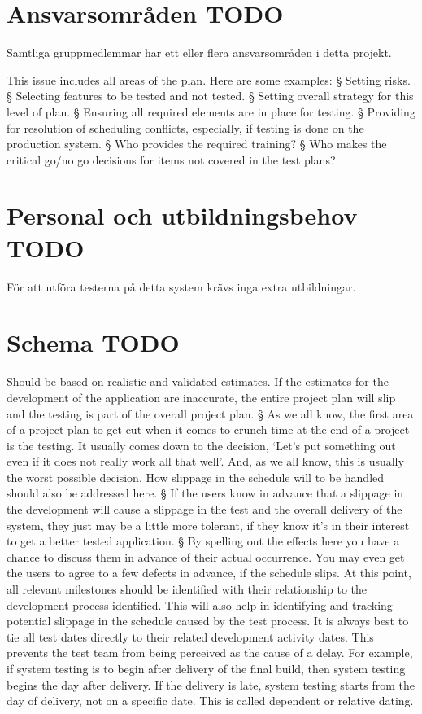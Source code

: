 \documentclass[10pt]{article}
\begin{document}
\section{Ansvarsområden {\color{red}TODO}}
	Samtliga gruppmedlemmar har ett eller flera ansvarsområden i detta projekt. 

This issue includes all areas of the plan.  Here are some examples: 
§ 
Setting risks. 
§ 
Selecting features to be tested and not tested. 
§ 
Setting overall strategy for this level of plan. 
§ 
Ensuring all required elements are in place for testing. 
§ 
Providing for resolution of scheduling conflicts, especially, if testing is done on the 
production system. 
§ 
Who provides the required training? 
§ 
Who makes the critical go/no go decisions for items not covered in the test plans?




\section{Personal och utbildningsbehov {\color{red}TODO}}
	För att utföra testerna på detta system krävs inga extra utbildningar.

\section{Schema {\color{red}TODO}}

Should be based on realistic and validated estimates.  If the estimates for the development of 
the application are inaccurate, the entire project plan will slip and the testing is part of the 
overall project plan. 
§ 
As we all know, the first area of a project plan to get cut when it comes to crunch time at 
the end of a project is the testing.  It usually comes down to the decision, ‘Let’s put 
something out even if it does not really work all that well’. And, as we all know, this is 
usually the worst possible decision. 
How slippage in the schedule will to be handled should also be addressed here. 
§ 
If the users know in advance that a slippage in the development will cause a slippage in 
the test and the overall delivery of the system, they just may be a little more tolerant, if 
they know it’s in their interest to get a better tested application. 
§ 
By spelling out the effects here you have a chance to discuss them in advance of their 
actual occurrence. You may even get the users to agree to a few defects in advance, if the 
schedule slips. 
At this point, all relevant milestones should be identified with their relationship to the 
development process identified.  This will also help in identifying and tracking potential 
slippage in the schedule caused by the test process. 
It is always best to tie all test dates directly to their related development activity dates.  This 
prevents the test team from being perceived as the cause of a delay.  For example, if system 
testing is to begin after delivery of the final build, then system testing begins the day after 
delivery.  If the delivery is late, system testing starts from the day of delivery, not on a 
specific date.  This is called dependent or relative dating. 
\end{document}
